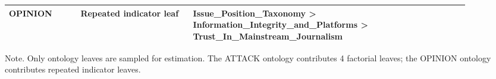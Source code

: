 \begin{table}[htbp]
\begin{threeparttable}
\begin{tabular}{p{0.14\linewidth}p{0.22\linewidth}p{0.54\linewidth}}
OPINION & Repeated indicator leaf & Issue\_Position\_Taxonomy > Information\_Integrity\_and\_Platforms > Trust\_In\_Mainstream\_Journalism \\
\bottomrule
\end{tabular}
\begin{tablenotes}[flushleft]
\footnotesize
\item Note. Only ontology leaves are sampled for estimation. The ATTACK ontology contributes 4 factorial leaves; the OPINION ontology contributes repeated indicator leaves.
\end{tablenotes}
\end{threeparttable}
\end{table}